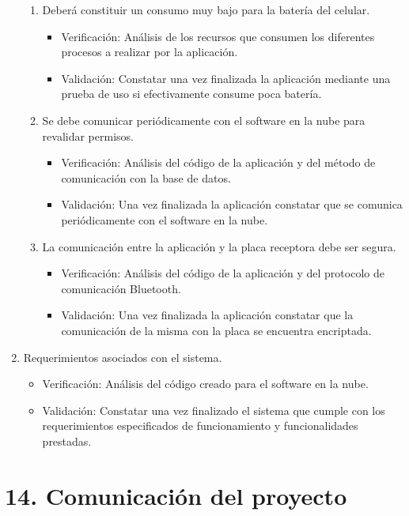 \documentclass[11pt]{charter}
\begin{document}
\begin{enumerate}
\begin{enumerate}
	\item Deberá constituir un consumo muy bajo para la batería del celular.
		\begin{itemize}
		\item Verificación: Análisis de los recursos que consumen los diferentes procesos a realizar por la aplicación.
		\item Validación: Constatar una vez finalizada la aplicación mediante una prueba de uso si efectivamente consume poca batería.
		\end{itemize}
		
	\item Se debe comunicar periódicamente con el software en la nube para revalidar permisos.
		\begin{itemize}
		\item Verificación: Análisis del código de la aplicación y del método de comunicación con la base de datos.
		\item Validación: Una vez finalizada la aplicación constatar que se comunica periódicamente con el software en la nube.
		\end{itemize}
		
		\item La comunicación entre la aplicación y la placa receptora debe ser segura.
		\begin{itemize}
		\item Verificación: Análisis del código de la aplicación y del protocolo de comunicación Bluetooth.
		\item Validación: Una vez finalizada la aplicación constatar que la comunicación de la misma con la placa se encuentra encriptada.
		\end{itemize}
	\end{enumerate}
	
\item Requerimientos asociados con el sistema.
	\begin{itemize}
	\item Verificación: Análisis del código creado para el software en la nube.
	\item Validación: Constatar una vez finalizado el sistema que cumple con los requerimientos especificados de funcionamiento y funcionalidades prestadas.
	\end{itemize}
	
\end{enumerate}

\newpage

\section{14. Comunicación del proyecto}
\label{sec:comunicaciones}
\end{document}
